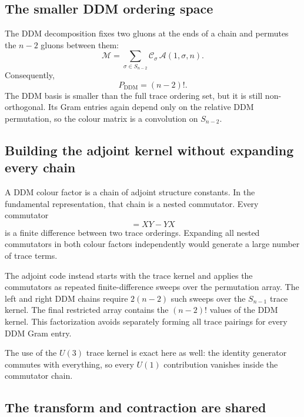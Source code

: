 \documentclass[11pt,a4paper]{article}
\newcommand{\cA}{\mathcal{A}}
\newcommand{\cC}{\mathcal{C}}
\newcommand{\cM}{\mathcal{M}}
\begin{document}
\subsection{The smaller DDM ordering space}

The DDM decomposition fixes two gluons at the ends of a chain and permutes
the $n-2$ gluons between them:
\begin{equation}
  \cM=\sum_{\sigma\in S_{n-2}}
      \cC_\sigma\,\cA(1,\sigma,n).
\end{equation}
Consequently,
\begin{equation}
  P_{\mathrm{DDM}}=(n-2)!.
\end{equation}
The DDM basis is smaller than the full trace ordering set, but it is still
non-orthogonal.  Its Gram entries again depend only on the relative DDM
permutation, so the colour matrix is a convolution on $S_{n-2}$.

\subsection{Building the adjoint kernel without expanding every chain}

A DDM colour factor is a chain of adjoint structure constants.  In the
fundamental representation, that chain is a nested commutator.  Every
commutator
\begin{equation}
  [X,Y]=XY-YX
\end{equation}
is a finite difference between two trace orderings.  Expanding all nested
commutators in both colour factors independently would generate a large
number of trace terms.

The adjoint code instead starts with the trace kernel and applies the
commutators as repeated finite-difference sweeps over the permutation array.
The left and right DDM chains require $2(n-2)$ such sweeps over the
$S_{n-1}$ trace kernel.  The final restricted array contains the
$(n-2)!$ values of the DDM kernel.  This factorization avoids separately
forming all trace pairings for every DDM Gram entry.

The use of the $U(3)$ trace kernel is exact here as well: the identity
generator commutes with everything, so every $U(1)$ contribution vanishes
inside the commutator chain.

\subsection{The transform and contraction are shared}
\end{document}
